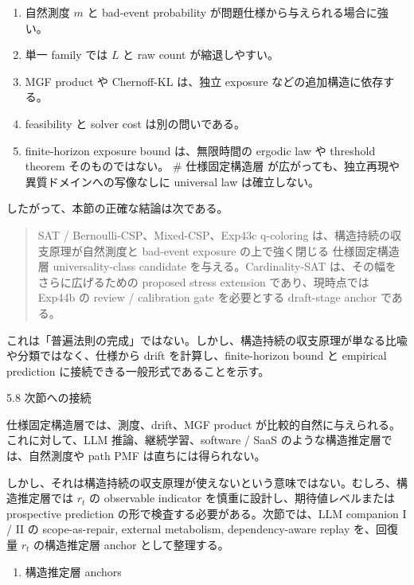 \documentclass[12pt,a4paper]{article}
\begin{document}
\begin{enumerate}
\def\labelenumi{\arabic{enumi}.}
\tightlist
\item
  自然測度 \(m\) と bad-event probability が問題仕様から与えられる場合に強い。
\item
  単一 family では \(L\) と raw count が縮退しやすい。
\item
  MGF product や Chernoff-KL は、独立 exposure などの追加構造に依存する。
\item
  feasibility と solver cost は別の問いである。
\item
  finite-horizon exposure bound は、無限時間の ergodic law や threshold theorem そのものではない。 \# 仕様固定構造層 が広がっても、独立再現や異質ドメインへの写像なしに universal law は確立しない。
\end{enumerate}

したがって、本節の正確な結論は次である。

\begin{quote}
SAT / Bernoulli-CSP、Mixed-CSP、Exp43c q-coloring は、構造持続の収支原理が自然測度と bad-event exposure の上で強く閉じる 仕様固定構造層 universality-class candidate を与える。Cardinality-SAT は、その幅をさらに広げるための proposed stress extension であり、現時点では Exp44b の review / calibration gate を必要とする draft-stage anchor である。
\end{quote}

これは「普遍法則の完成」ではない。しかし、構造持続の収支原理が単なる比喩や分類ではなく、仕様から drift を計算し、finite-horizon bound と empirical prediction に接続できる一般形式であることを示す。

5.8 次節への接続

仕様固定構造層では、測度、drift、MGF product が比較的自然に与えられる。これに対して、LLM 推論、継続学習、software / SaaS のような構造推定層では、自然測度や path PMF は直ちには得られない。

しかし、それは構造持続の収支原理が使えないという意味ではない。むしろ、構造推定層では \(r_{t}\) の observable indicator を慎重に設計し、期待値レベルまたは prospective prediction の形で検査する必要がある。次節では、LLM companion I / II の scope-as-repair, external metabolism, dependency-aware replay を、回復量 \(r_{t}\) の構造推定層 anchor として整理する。

\begin{enumerate}
\def\labelenumi{\arabic{enumi}.}
\setcounter{enumi}{5}
\tightlist
\item
  構造推定層 anchors
\end{enumerate}
\end{document}
